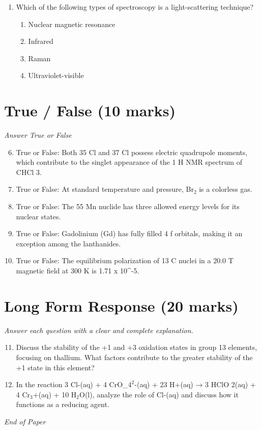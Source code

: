 \documentclass[12pt]{article}
\begin{document}
\begin{enumerate}[label=\arabic*.]
\begin{enumerate}[label=(\alph*)]
    \item Neutrons
    \item Alpha particles
    \item Beta particles
    \item X-rays
\end{enumerate}
\item Which of the following types of spectroscopy is a light-scattering technique?
\begin{enumerate}[label=(\alph*)]
    \item Nuclear magnetic resonance
    \item Infrared
    \item Raman
    \item Ultraviolet-visible
\end{enumerate}
\end{enumerate}

\section*{True / False (10 marks)}
\textit{Answer True or False}
\begin{enumerate}[label=\arabic*.]
\setcounter{enumi}{5}
\item True or False: Both 35 Cl and 37 Cl possess electric quadrupole moments, which contribute to the singlet appearance of the 1 H NMR spectrum of CHCl 3.
\item True or False: At standard temperature and pressure, Br$_{2}$ is a colorless gas.
\item True or False: The 55 Mn nuclide has three allowed energy levels for its nuclear states.
\item True or False: Gadolinium (Gd) has fully filled 4 f orbitals, making it an exception among the lanthanides.
\item True or False: The equilibrium polarization of 13 C nuclei in a 20.0 T magnetic field at 300 K is 1.71 x 10^-5.
\end{enumerate}

\section*{Long Form Response (20 marks)}
\textit{Answer each question with a clear and complete explanation.}
\begin{enumerate}[label=\arabic*.]
\setcounter{enumi}{10}
\item Discuss the stability of the +1 and +3 oxidation states in group 13 elements, focusing on thallium. What factors contribute to the greater stability of the +1 state in this element?
\item In the reaction 3 Cl-(aq) + 4 CrO\_$4^2$-(aq) + 23 H+(aq) → 3 HClO 2(aq) + 4 Cr$_{3}$+(aq) + 10 H$_{2}$O(l), analyze the role of Cl-(aq) and discuss how it functions as a reducing agent.
\end{enumerate}

\vfill
\noindent\textit{End of Paper}
\end{document}
